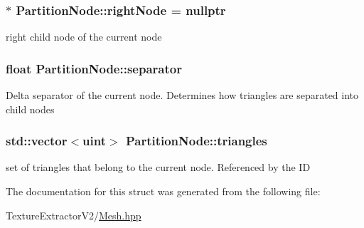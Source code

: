 \subsubsection[{right\+Node}]{$\ast$ Partition\+Node\+::right\+Node = nullptr}\label{struct_partition_node_a673d8267a9eb0a5c77bdfc48b00f1e16}
right child node of the current node \hypertarget{struct_partition_node_aa1c74a380fa906533ad5e7649293e711}{}
\subsubsection[{separator}]{\setlength{\rightskip}{0pt plus 5cm}float Partition\+Node\+::separator}\label{struct_partition_node_aa1c74a380fa906533ad5e7649293e711}
Delta separator of the current node. Determines how triangles are separated into child nodes \hypertarget{struct_partition_node_a45bf7beca48bcb4533d7f7d21e0df440}{}
\subsubsection[{triangles}]{\setlength{\rightskip}{0pt plus 5cm}std\+::vector$<$uint$>$ Partition\+Node\+::triangles}\label{struct_partition_node_a45bf7beca48bcb4533d7f7d21e0df440}
set of triangles that belong to the current node. Referenced by the I\+D 

The documentation for this struct was generated from the following file\+:\begin{DoxyCompactItemize}
\item 
Texture\+Extractor\+V2/\hyperlink{_mesh_8hpp}{Mesh.\+hpp}\end{DoxyCompactItemize}
